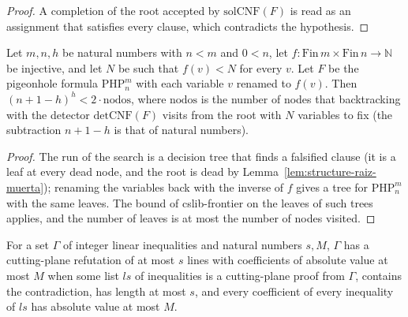 \begin{proof}
  \leanok
  A completion of the root accepted by $\mathrm{solCNF}(F)$ is read as an assignment that satisfies
  every clause, which contradicts the hypothesis.
\end{proof}

\begin{theorem}
  \label{thm:structure-palomar-nodos}
  \leanok
  Let $m, n, h$ be natural numbers with $n < m$ and $0 < n$, let $f : \mathrm{Fin}\,m \times
  \mathrm{Fin}\,n \to \mathbb{N}$ be injective, and let $N$ be such that $f(v) < N$ for every $v$.
  Let $F$ be the pigeonhole formula $\mathrm{PHP}^m_n$ with each variable $v$ renamed to $f(v)$.
  Then $(n + 1 - h)^h < 2 \cdot \mathrm{nodos}$, where $\mathrm{nodos}$ is the number of nodes that
  backtracking with the detector $\mathrm{detCNF}(F)$ visits from the root with $N$ variables to
  fix (the subtraction $n + 1 - h$ is that of natural numbers).
\end{theorem}

\begin{proof}
  \leanok
  The run of the search is a decision tree that finds a falsified clause (it is a leaf at every
  dead node, and the root is dead by Lemma~\ref{lem:structure-raiz-muerta}); renaming the
  variables back with the inverse of $f$ gives a tree for $\mathrm{PHP}^m_n$ with the same leaves.
  The bound of cslib-frontier on the leaves of such trees applies, and the number of leaves is at
  most the number of nodes visited.
\end{proof}

\begin{definition}
  \label{def:structure-refuta-acotada}
  \leanok
  For a set $\Gamma$ of integer linear inequalities and natural numbers $s, M$, $\Gamma$ has a
  cutting-plane refutation of at most $s$ lines with coefficients of absolute value at most $M$
  when some list $ls$ of inequalities is a cutting-plane proof from $\Gamma$, contains the
  contradiction, has length at most $s$, and every coefficient of every inequality of $ls$ has
  absolute value at most $M$.
  \own{}
\end{definition}

